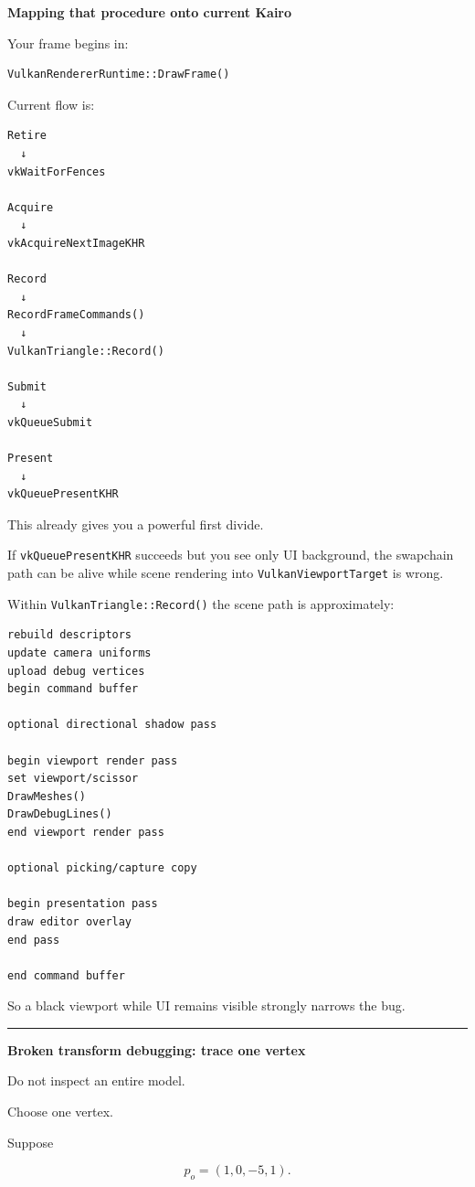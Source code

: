 \textbf{Mapping that procedure onto current Kairo}

Your frame begins in:

\begin{verbatim}
VulkanRendererRuntime::DrawFrame()
\end{verbatim}

Current flow is:

\begin{verbatim}
Retire
  ↓
vkWaitForFences

Acquire
  ↓
vkAcquireNextImageKHR

Record
  ↓
RecordFrameCommands()
  ↓
VulkanTriangle::Record()

Submit
  ↓
vkQueueSubmit

Present
  ↓
vkQueuePresentKHR
\end{verbatim}

This already gives you a powerful first divide.

If \texttt{vkQueuePresentKHR} succeeds but you see only UI background, the swapchain path can be alive while scene rendering into \texttt{VulkanViewportTarget} is wrong.

Within \texttt{VulkanTriangle::Record()} the scene path is approximately:

\begin{verbatim}
rebuild descriptors
update camera uniforms
upload debug vertices
begin command buffer

optional directional shadow pass

begin viewport render pass
set viewport/scissor
DrawMeshes()
DrawDebugLines()
end viewport render pass

optional picking/capture copy

begin presentation pass
draw editor overlay
end pass

end command buffer
\end{verbatim}

So a black viewport while UI remains visible strongly narrows the bug.

\begin{center}\rule{0.5\linewidth}{0.5pt}\end{center}

\textbf{Broken transform debugging: trace one vertex}

Do not inspect an entire model.

Choose one vertex.

Suppose

\[
p_o=
(1,0,-5,1).
\]

